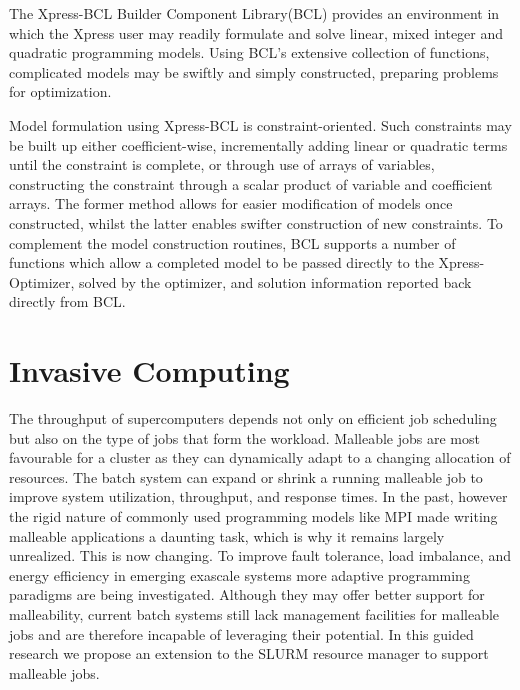 \documentclass[a4paper, 12pt]{article}
\begin{document}
\noindent
The Xpress-BCL Builder Component Library(BCL) provides an environment in which the Xpress user may readily formulate and solve linear, mixed integer and quadratic programming models. Using BCL’s extensive collection of functions, complicated models may be swiftly and simply constructed, preparing problems for optimization.\\ \par
\noindent
Model formulation using Xpress-BCL is constraint-oriented. Such constraints may be built up either coefficient-wise, incrementally adding 
linear or quadratic terms until the constraint is complete, or through use of arrays of variables, constructing the constraint through a 
scalar product of variable and coefficient arrays. The former method allows for easier modification of models once constructed, whilst the 
latter enables swifter construction of new constraints. To complement the model construction routines, BCL supports a number of functions which allow a completed model to be passed directly to the Xpress-Optimizer, solved by the optimizer, and solution information reported back 
directly from BCL.
\newpage
\section{Invasive Computing}
The throughput of supercomputers depends not only on efficient job scheduling but also on the type of jobs that form the workload. Malleable jobs are most favourable for a cluster as they can dynamically adapt to a changing allocation of resources. The batch system can expand or shrink a running malleable job to improve system utilization, throughput, and response times. In the past, however the rigid nature of commonly used programming models like MPI made writing malleable applications a daunting task, which is why it remains largely unrealized. This is now changing. To improve fault tolerance, load imbalance, and energy efficiency in emerging exascale systems more adaptive programming paradigms are being investigated. Although they may offer better support for malleability, current batch systems still lack management facilities for malleable jobs and are therefore incapable of leveraging their potential. In this guided research we propose an extension to the SLURM resource manager to support malleable jobs.
\end{document}
